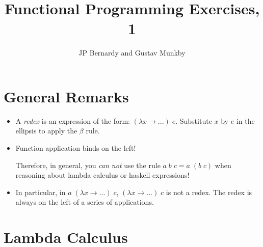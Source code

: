 \documentclass{article}
\title{Functional Programming Exercises, 1}
\author{JP Bernardy and Gustav Munkby}
\newcommand{\Varid}[1]{\mathit{#1}}
\begin{document}
\maketitle

\section{General Remarks}

\begin{itemize}
\item
A \emph{redex} is an expression of the form:
\ensuremath{(\lambda \Varid{x}\to \mathbin{...})\;\Varid{e}}. Substitute \ensuremath{\Varid{x}} by \ensuremath{\Varid{e}} in the ellipsis
to apply the $\beta$ rule.

\item
Function application binds on the left!

Therefore, in general, you {\em can not} use the rule
\ensuremath{\Varid{a}\;\Varid{b}\;\Varid{c}\mathrel{=}\Varid{a}\;(\Varid{b}\;\Varid{c})}
when reasoning about lambda calculus or haskell expressions!

\item
In particular, in \ensuremath{\Varid{a}\;(\lambda \Varid{x}\to \mathbin{...})\;\Varid{c}}, \ensuremath{(\lambda \Varid{x}\to \mathbin{...})\;\Varid{c}} is not a redex.
The redex is always on the left of a series of applications.
\end{itemize}



\section{Lambda Calculus}

\end{document}
